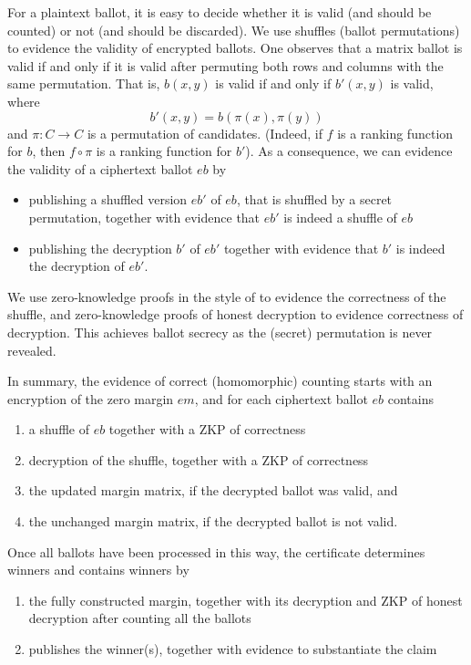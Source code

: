 \documentclass{llncs}
\newcounter{mycnt}
\newcommand{\encb}{\mathit{eb}}
\newcommand{\encm}{\mathit{em}}
\begin{document}
For a plaintext ballot, it is easy to decide whether it is
valid (and should be counted) or not (and should be discarded). We
use shuffles (ballot permutations) to evidence the validity of
encrypted ballots. One observes that a matrix ballot is valid if and
only if it is valid after permuting both rows and columns with the
same permutation. That is, $b(x,y)$ is valid if and only if $b'(x,y)$
is valid, where
\[ b'(x,y) = b(\pi(x), \pi(y)) \]
and $\pi: C \to C$ is a permutation of candidates. (Indeed, if $f$
is a ranking function for $b$, then $f \circ \pi$ is a ranking
function for $b'$). As a consequence, we can evidence the validity
of a ciphertext ballot $\encb$ by
\begin{itemize}
  \item publishing a shuffled version $\encb'$ of $\encb$, that is
  shuffled by a secret permutation, together with
  evidence that $\encb'$ is indeed a shuffle of $\encb$
  \item publishing the decryption $b'$ of $\encb'$ together with
  evidence that $b'$ is indeed the decryption of $\encb'$.
\end{itemize}

\noindent
We use zero-knowledge proofs in the style of \cite{DBLP:conf/africacrypt/TereliusW10}
to evidence the correctness of the shuffle, and zero-knowledge
proofs of honest decryption \cite{DBLP:conf/crypto/ChaumP92} to evidence
correctness of decryption. This achieves ballot secrecy as
the (secret) permutation is never revealed.

In summary, the evidence of correct (homomorphic) counting starts
with an encryption of the zero margin $\encm$, and for each
ciphertext ballot $\encb$ contains
\begin{enumerate}
\item \label{it:shuff} a shuffle of $\encb$ together with a ZKP of 
correctness
\item decryption of the  shuffle, together with a ZKP of
correctness
\item \label{it:upd-marg} the updated margin matrix, if the decrypted ballot
was valid, and
\item the unchanged margin matrix, if the decrypted
ballot is not valid.
\setcounter{mycnt}{\value{enumi}}
\end{enumerate}
Once all ballots have been processed in this way, the certificate
determines winners and contains
winners by
\begin{enumerate}
\setcounter{enumi}{\value{mycnt}}
\item \label{it:pub-dm} the fully constructed margin, together with its decryption  
  and ZKP of honest decryption after counting all the ballots     
\item publishes the winner(s), together with evidence to substantiate the
    claim
\end{enumerate}
\end{document}
